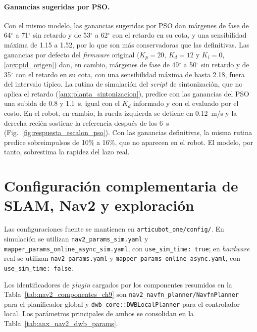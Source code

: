 \begin{appendices}
\paragraph{Ganancias sugeridas por PSO.} Con el mismo modelo, las ganancias
sugeridas por PSO dan márgenes de fase de 64$^\circ$ a 71$^\circ$ sin retardo y
de 53$^\circ$ a 62$^\circ$ con el retardo en su cota, y una sensibilidad máxima
de 1.15 a 1.52, por lo que son más conservadoras que las definitivas. Las
ganancias por defecto del \textit{firmware} original ($K_p=20$, $K_d=12$ y
$K_i=0$, \ref{anx:pid_origen}) dan, en cambio, márgenes de fase de 49$^\circ$ a
50$^\circ$ sin retardo y de 35$^\circ$ con el retardo en su cota, con una
sensibilidad máxima de hasta 2.18, fuera del intervalo típico. La rutina de
simulación del \textit{script} de sintonización, que
no aplica el retardo (\ref{anx:planta_sintonizacion}), predice con las ganancias del PSO una
subida de 0.8 y 1.1~s, igual con el $K_d$ informado y con el evaluado por el
costo. En el robot, en cambio, la rueda izquierda se detiene en 0.12~m/s y la
derecha recién sostiene la referencia después de los 6~s
(Fig.~\ref{fig:respuesta_escalon_pso}). Con las ganancias definitivas, la misma
rutina predice sobreimpulsos de 10\% a 16\%, que no aparecen en el robot. El
modelo, por tanto, sobrestima la rapidez del lazo real.

\section{Configuración complementaria de SLAM, Nav2 y exploración}
\label{anx:nav2_slam_config}

Las configuraciones fuente se mantienen en \texttt{articubot\_\allowbreak{}one/\allowbreak{}config/}. En simulación se utilizan \texttt{nav2\_params\_sim.yaml} y \texttt{mapper\_params\_online\_async\_sim.yaml}, con \texttt{use\_sim\_time: true}; en \textit{hardware} real se utilizan \texttt{nav2\_params.yaml} y \texttt{mapper\_params\_online\_async.yaml}, con \texttt{use\_sim\_time: false}.

Los identificadores de \textit{plugin} cargados por los componentes resumidos
en la Tabla~\ref{tab:nav2_componentes_ch9} son
\texttt{nav2\_navfn\_planner/NavfnPlanner} para el planificador global y
\texttt{dwb\_core::DWBLocalPlanner} para el controlador local. Los parámetros principales de ambos se consolidan en la
Tabla~\ref{tab:anx_nav2_dwb_params}.


\end{appendices}
